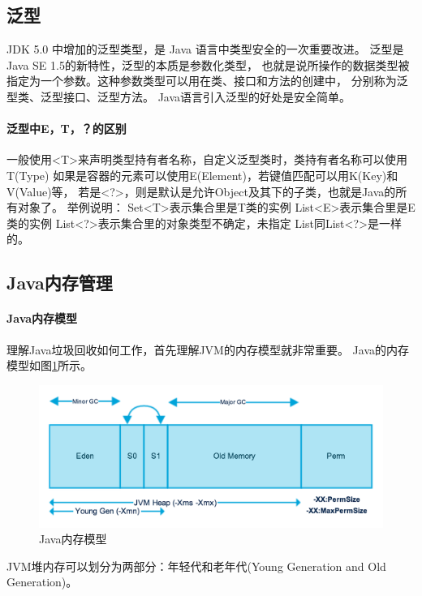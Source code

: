 \documentclass{book}
\begin{document}
\subsection{泛型}

JDK 5.0 中增加的泛型类型，是 Java 语言中类型安全的一次重要改进。
泛型是Java SE 1.5的新特性，泛型的本质是参数化类型，
也就是说所操作的数据类型被指定为一个参数。这种参数类型可以用在类、接口和方法的创建中，
分别称为泛型类、泛型接口、泛型方法。 Java语言引入泛型的好处是安全简单。

\paragraph{泛型中E，T，？的区别}

一般使用<T>来声明类型持有者名称，自定义泛型类时，类持有者名称可以使用T(Type) 
如果是容器的元素可以使用E(Element)，若键值匹配可以用K(Key)和V(Value)等， 
若是<?>，则是默认是允许Object及其下的子类，也就是Java的所有对象了。
举例说明： 
Set<T>表示集合里是T类的实例 
List<E>表示集合里是E类的实例 
List<?>表示集合里的对象类型不确定，未指定 
List同List<?>是一样的。

\subsection{Java内存管理}

\paragraph{Java内存模型}
理解Java垃圾回收如何工作，首先理解JVM的内存模型就非常重要。
Java的内存模型如图\ref{fig:JavaMemoryModel}所示。

\begin{figure}[htbp]
	\centering
	\includegraphics[scale=0.6]{JavaMemoryModel.png}
	\caption{Java内存模型}
	\label{fig:JavaMemoryModel}
\end{figure}

JVM堆内存可以划分为两部分：年轻代和老年代(Young Generation and Old Generation)。
\end{document}
